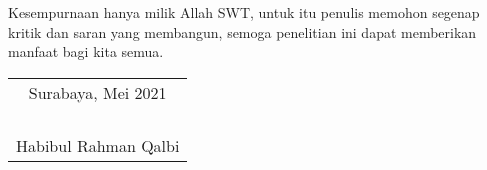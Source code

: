 \newpage
Kesempurnaan hanya milik Allah SWT, untuk itu penulis memohon segenap kritik dan saran yang membangun, semoga penelitian ini dapat memberikan manfaat bagi kita semua.

\begin{flushright}
  \begin{tabular}[b]{c}
    Surabaya, Mei 2021\\
    \\
    \\
    \\
    \\
    Habibul Rahman Qalbi
  \end{tabular}
\end{flushright}
